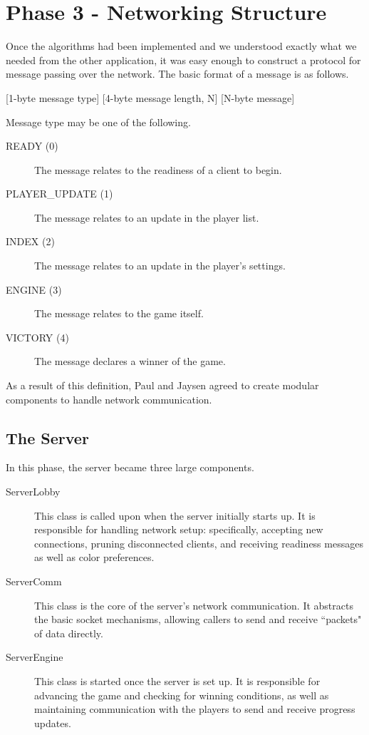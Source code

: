 \section{Phase 3 - Networking Structure}
Once the algorithms had been implemented and we understood exactly what we needed
from the other application, it was easy enough to construct a protocol for message
passing over the network. The basic format of a message is as follows.

[1-byte message type] [4-byte message length, N] [N-byte message]

Message type may be one of the following.
\begin{description}
    \item[READY (0)] The message relates to the readiness of a client to begin.
    \item[PLAYER\_UPDATE (1)] The message relates to an update in the player list.
    \item[INDEX (2)] The message relates to an update in the player's settings.
    \item[ENGINE (3)] The message relates to the game itself.
    \item[VICTORY (4)] The message declares a winner of the game.
\end{description}

As a result of this definition, Paul and Jaysen agreed to create modular components
to handle network communication.

\subsection{The Server}
In this phase, the server became three large components.
\begin{description}
    \item[ServerLobby] This class is called upon when the server initially starts
        up. It is responsible for handling network setup: specifically, accepting
        new connections, pruning disconnected clients, and receiving readiness
        messages as well as color preferences.
    \item[ServerComm] This class is the core of the server's network
        communication. It abstracts the basic socket mechanisms, allowing
        callers to send and receive ``packets" of data directly.
    \item[ServerEngine] This class is started once the server is set up. It is
        responsible for advancing the game and checking for winning conditions,
        as well as maintaining communication with the players to send and
        receive progress updates.
\end{description}

